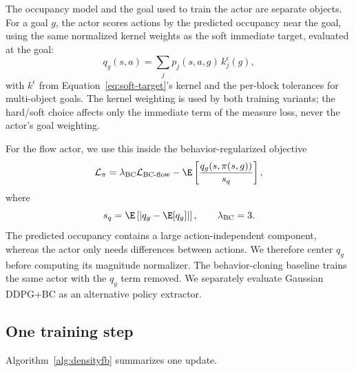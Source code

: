 The occupancy model and the goal used to train the actor are separate objects.
For a goal $g$, the actor scores actions by the predicted occupancy near the goal, using the same normalized kernel weights as the soft immediate target, evaluated at the goal:
\begin{equation}
\label{eq:goal-readout}
q_g(s,a) = \sum_j p_j(s,a,g)\, k_j^\epsilon(g),
\end{equation}
with $k^\epsilon$ from Equation~\ref{eq:soft-target}'s kernel and the per-block tolerances for multi-object goals.
The kernel weighting is used by both training variants; the hard/soft choice affects only the immediate term of the measure loss, never the actor's goal weighting.

For the flow actor, we use this inside the behavior-regularized objective
\begin{equation}
\label{eq:actor}
    \mathcal L_\pi = \lambda_{\mathrm{BC}} \mathcal L_{\mathrm{BC\text{-}flow}} - \E\left[ \frac{ q_g(s,\pi(s,g)) }{s_q} \right],
\end{equation}
where
\begin{equation}
    s_q = \E\left[ \left| q_g-\E[q_g] \right| \right], \qquad \lambda_{\mathrm{BC}}=3.
\end{equation}
The predicted occupancy contains a large action-independent component, whereas the actor only needs differences between actions.
We therefore center $q_g$ before computing its magnitude normalizer.
The behavior-cloning baseline trains the same actor with the $q_g$ term removed.
We separately evaluate Gaussian DDPG+BC as an alternative policy extractor.

\subsection{One training step}
Algorithm~\ref{alg:densityfb} summarizes one \DensityFB{} update.

